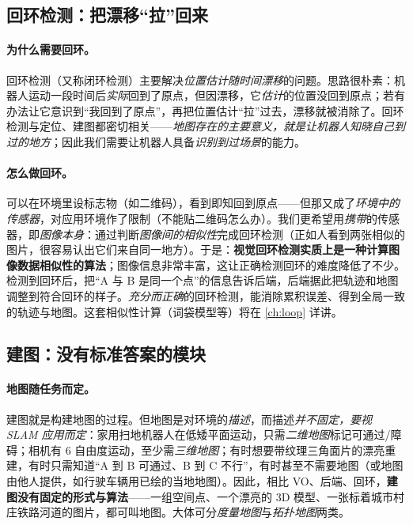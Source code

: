 \subsection{回环检测：把漂移“拉”回来}
\label{sec:intro-loop}
\paragraph{为什么需要回环。}
回环检测（又称闭环检测）主要解决\emph{位置估计随时间漂移}的问题\cite{gaoxiang2019slam14}。思路很朴素：机器人运动一段时间后\emph{实际}回到了原点，但因漂移，它\emph{估计}的位置没回到原点；若有办法让它意识到“我回到了原点”，再把位置估计“拉”过去，漂移就被消除了。回环检测与定位、建图都密切相关——\emph{地图存在的主要意义，就是让机器人知晓自己到过的地方}；因此我们需要让机器人具备\emph{识别到过场景}的能力。

\paragraph{怎么做回环。}
可以在环境里设标志物（如二维码），看到即知回到原点——但那又成了\emph{环境中的传感器}，对应用环境作了限制（不能贴二维码怎么办）。我们更希望用\emph{携带}的传感器，即\emph{图像本身}：通过判断\emph{图像间的相似性}完成回环检测（正如人看到两张相似的图片，很容易认出它们来自同一地方）。于是：\textbf{视觉回环检测实质上是一种计算图像数据相似性的算法}\cite{gaoxiang2019slam14}；图像信息非常丰富，这让正确检测回环的难度降低了不少。检测到回环后，把“A 与 B 是同一个点”的信息告诉后端，后端据此把轨迹和地图调整到符合回环的样子。\emph{充分而正确}的回环检测，能消除累积误差、得到全局一致的轨迹与地图。这套相似性计算（词袋模型等）将在 \cref{ch:loop} 详讲。

\subsection{建图：没有标准答案的模块}
\label{sec:intro-mapping}
\paragraph{地图随任务而定。}
建图就是构建地图的过程。但地图是对环境的\emph{描述}，而描述\emph{并不固定，要视 SLAM 应用而定}\cite{gaoxiang2019slam14}：家用扫地机器人在低矮平面运动，只需\emph{二维地图}标记可通过/障碍；相机有 $6$ 自由度运动，至少需\emph{三维地图}；有时想要带纹理三角面片的漂亮重建，有时只需知道“A 到 B 可通过、B 到 C 不行”，有时甚至不需要地图（或地图由他人提供，如行驶车辆用已绘的当地地图）。因此，相比 VO、后端、回环，\textbf{建图没有固定的形式与算法}——一组空间点、一个漂亮的 3D 模型、一张标着城市村庄铁路河道的图片，都可叫地图。大体可分\emph{度量地图}与\emph{拓扑地图}两类。

